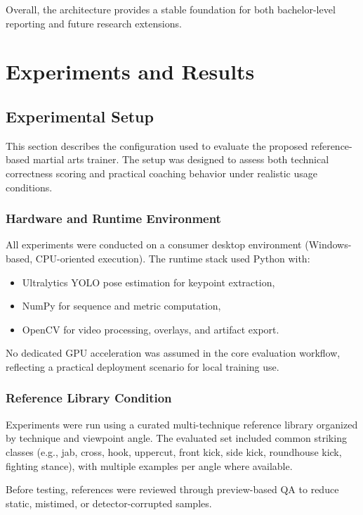 \documentclass[12pt]{article}
\begin{document}
{Overall, the architecture provides a stable foundation for both bachelor-level reporting and future research extensions.

\section{Experiments and Results}

\subsection{Experimental Setup}

This section describes the configuration used to evaluate the proposed reference-based martial arts trainer. The setup was designed to assess both technical correctness scoring and practical coaching behavior under realistic usage conditions.

\subsubsection{Hardware and Runtime Environment}

All experiments were conducted on a consumer desktop environment (Windows-based, CPU-oriented execution). The runtime stack used Python with:

\begin{itemize}
    \item Ultralytics YOLO pose estimation for keypoint extraction,
    \item NumPy for sequence and metric computation,
    \item OpenCV for video processing, overlays, and artifact export.
\end{itemize}

No dedicated GPU acceleration was assumed in the core evaluation workflow, reflecting a practical deployment scenario for local training use.

\subsubsection{Reference Library Condition}

Experiments were run using a curated multi-technique reference library organized by technique and viewpoint angle. The evaluated set included common striking classes (e.g., jab, cross, hook, uppercut, front kick, side kick, roundhouse kick, fighting stance), with multiple examples per angle where available.

Before testing, references were reviewed through preview-based QA to reduce static, mistimed, or detector-corrupted samples.

}
\end{document}
